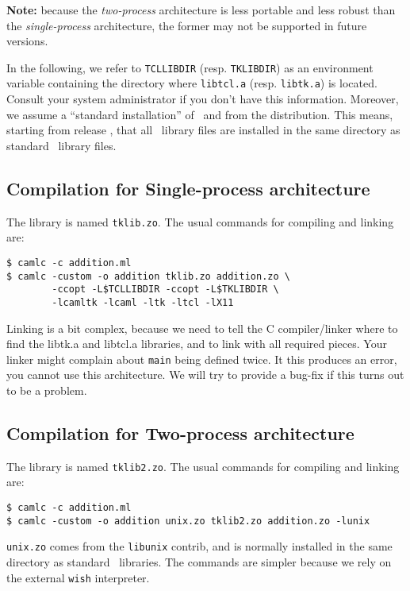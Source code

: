 {\bf Note: } because the {\em two-process} architecture is less portable and
less robust than the {\em single-process} architecture, the former may not
be supported in future versions.


In the following, we refer to \verb|TCLLIBDIR| (resp. \verb|TKLIBDIR|) as
an environment variable containing the directory where \verb|libtcl.a|
(resp. \verb|libtk.a|) is located. Consult your system administrator if you
don't have this information. Moreover, we assume a ``standard installation''
of \caml\ and \camltk from the distribution. This means, starting from
release \thisrelease, that all \camltk\ library files are installed in the
same directory as standard \caml\ library files.

\subsection{Compilation for Single-process architecture}
The library is named \verb|tklib.zo|.
The usual commands for compiling and linking are:
\begin{verbatim}
$ camlc -c addition.ml
$ camlc -custom -o addition tklib.zo addition.zo \
        -ccopt -L$TCLLIBDIR -ccopt -L$TKLIBDIR \
        -lcamltk -lcaml -ltk -ltcl -lX11
\end{verbatim}
Linking is a bit complex, because we need to tell the C compiler/linker
where to find the libtk.a and libtcl.a libraries, and to link with all
required pieces. Your linker might complain about \verb|main| being defined
twice. It this produces an error, you cannot use this architecture.
We will try to provide a bug-fix if this turns out to be a problem.

\subsection{Compilation for Two-process architecture}
The library is named \verb|tklib2.zo|.
The usual commands for compiling and linking are:
\begin{verbatim}
$ camlc -c addition.ml
$ camlc -custom -o addition unix.zo tklib2.zo addition.zo -lunix
\end{verbatim} 
 \verb|unix.zo| comes from the \verb|libunix| contrib, and is normally
installed in the same directory as standard \caml\ libraries. 
The commands are simpler because we rely on the external \verb|wish|
interpreter.

